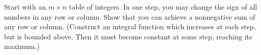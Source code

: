 Start with an $m \times n$ table of integers. In one step, you may change the sign of all numbers in any row or column. Show that you can achieve a nonnegative sum of any row or column. (Construct an integral function which increases at each step, but is bounded above. Then it must become constant at some step, reaching its maximum.)
